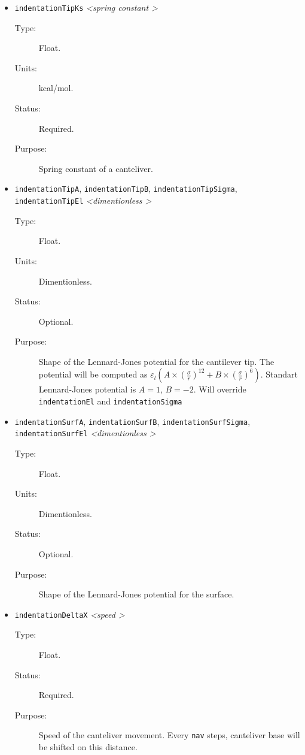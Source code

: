 \documentclass[a4paper]{article}
\begin{document}
\begin{itemize}
\item \texttt{indentationTipKs} \textit{\textless spring constant \textgreater}
\begin{description}
\item[Type:] Float.
\item[Units:] kcal/mol.
\item[Status:] Required.
\item[Purpose:] Spring constant of a canteliver.
\end{description}

\item \texttt{indentationTipA}, \texttt{indentationTipB}, \texttt{indentationTipSigma}, \texttt{indentationTipEl} \textit{\textless dimentionless \textgreater}
\begin{description}
\item[Type:] Float.
\item[Units:] Dimentionless.
\item[Status:] Optional.
\item[Purpose:] Shape of the Lennard-Jones potential for the cantilever tip. The potential will be computed as $\varepsilon_l(A\times(\frac{\sigma}{r})^{12}+B\times(\frac{\sigma}{r})^{6})$. Standart Lennard-Jones potential is $A=1$, $B=-2$. Will override \texttt{indentationEl} and \texttt{indentationSigma}
\end{description}

\item \texttt{indentationSurfA}, \texttt{indentationSurfB}, \texttt{indentationSurfSigma}, \texttt{indentationSurfEl} \textit{\textless dimentionless \textgreater}
\begin{description}
\item[Type:] Float.
\item[Units:] Dimentionless.
\item[Status:] Optional.
\item[Purpose:] Shape of the Lennard-Jones potential for the surface.
\end{description}

\item \texttt{indentationDeltaX} \textit{\textless speed \textgreater}
\begin{description}
\item[Type:] Float.
\item[Status:] Required.
\item[Purpose:] Speed of the canteliver movement. Every \texttt{nav} steps, canteliver base will be shifted on this distance.
\end{description}


\end{itemize}
\end{document}
